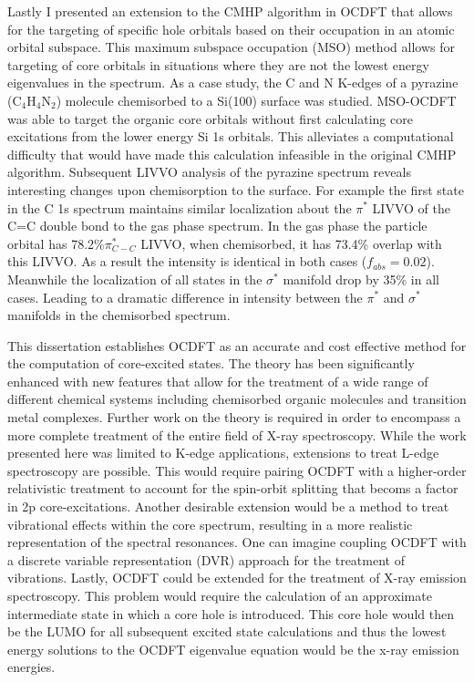 \documentclass{article}
\begin{document}
Lastly I presented an extension to the CMHP algorithm in OCDFT that allows for the targeting of specific hole orbitals based on their occupation in an atomic orbital subspace. This maximum subspace occupation (MSO) method allows for targeting of core orbitals in situations where they are not the lowest energy eigenvalues in the spectrum. As a case study, the C and N K-edges of a pyrazine (C$_4$H$_4$N$_2$) molecule chemisorbed to a Si(100) surface was studied. MSO-OCDFT was able to target the organic core orbitals without first calculating core excitations from the lower energy Si 1s orbitals. This alleviates a computational difficulty that would have made this calculation infeasible in the original CMHP algorithm. Subsequent LIVVO analysis of the pyrazine spectrum reveals interesting changes upon chemisorption to the surface. For example the first state in the C 1s spectrum maintains similar localization about the $\pi^*$ LIVVO of the C=C double bond to the gas phase spectrum. In the gas phase the particle orbital has 78.2\%$\pi^*_{C-C}$ LIVVO, when chemisorbed, it has 73.4\% overlap with this LIVVO. As a result the intensity is identical in both cases ($f_{abs} = 0.02$). Meanwhile the localization of all states in the $\sigma^*$ manifold drop by 35\% in all cases. Leading to a dramatic difference in intensity between the $\pi^*$ and $\sigma^*$ manifolds in the chemisorbed spectrum.

This dissertation establishes OCDFT as an accurate and cost effective method for the computation of core-excited states. The theory has been significantly enhanced with new features that allow for the treatment of a wide range of different chemical systems including chemisorbed organic molecules and transition metal complexes. Further work on the theory is required in order to encompass a more complete treatment of the entire field of X-ray spectroscopy. While the work presented here was limited to K-edge applications, extensions to treat L-edge spectroscopy are possible. This would require pairing OCDFT with a higher-order relativistic treatment to account for the spin-orbit splitting that becoms a factor in 2p core-excitations. Another desirable extension would be a method to treat vibrational effects within the core spectrum, resulting in a more realistic representation of the spectral resonances. One can imagine coupling OCDFT with a discrete variable representation (DVR) approach for the treatment of vibrations. Lastly, OCDFT could be extended for the treatment of X-ray emission spectroscopy. This problem would require the calculation of an approximate intermediate state in which a core hole is introduced. This core hole would then be the LUMO for all subsequent excited state calculations and thus the lowest energy solutions to the OCDFT eigenvalue equation would be the x-ray emission energies.
\end{document}
